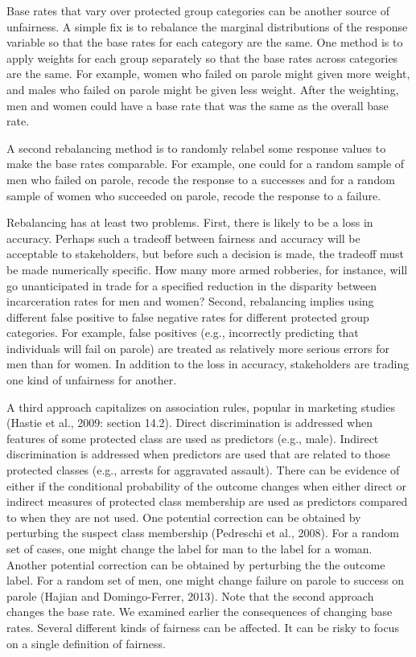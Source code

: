 \documentclass[12pt]{article}
\begin{document}
Base rates that vary over protected group categories can be another source of unfairness. A simple fix is to rebalance the marginal distributions of the response variable so that the base rates for each category are the same. One method is to apply weights for each group separately so that the base rates across categories are the same. For example, women who failed on parole might given more weight, and males who failed on parole might be given less weight. After the weighting, men and women could have a base rate that was the same as the overall base rate. 

A second rebalancing method is to randomly relabel some response values to make the base rates comparable. For example, one could for a random sample of men who failed on parole, recode the response to a successes and for a random sample of women who succeeded on parole, recode the response to a failure. 

Rebalancing has at least two problems. First, there is likely to be a loss in accuracy. Perhaps such a tradeoff between fairness and accuracy will be acceptable to stakeholders, but before such a decision is made, the tradeoff must be made numerically specific. How many more armed robberies, for instance, will go unanticipated in trade for a specified reduction in the disparity between incarceration rates for men and women? Second, rebalancing implies using different false positive to false negative rates for different protected group categories. For example, false positives (e.g., incorrectly predicting that individuals will fail on parole) are treated as relatively more serious errors for men than for women. In addition to the loss in accuracy, stakeholders are trading one kind of unfairness for another.

A third approach capitalizes on association rules, popular in marketing studies (Hastie et al., 2009: section 14.2). Direct discrimination is addressed when features of some protected class are used as predictors (e.g., male). Indirect discrimination is addressed when predictors are used that are related to those protected classes (e.g., arrests for aggravated assault). There can be evidence of either if the conditional probability of the outcome changes when either direct or indirect measures of protected class membership are used as predictors compared to when they are not used. One potential correction can be obtained by perturbing the suspect class membership (Pedreschi et al., 2008). For a random set of cases, one might change the label for man to the label for a woman. Another potential correction can be obtained by perturbing the the outcome label. For a random set of men, one might change failure on parole to success on parole (Hajian and Domingo-Ferrer, 2013). Note that the second approach changes the base rate. We examined earlier the consequences of changing base rates. Several different kinds of fairness can be affected. It can be risky to focus on a single definition of fairness. 
\end{document}
